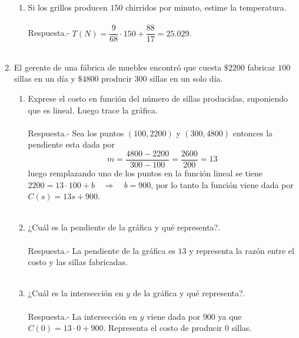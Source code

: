 \begin{enumerate}
\begin{enumerate}[\bfseries (a)]
	\item Si los grillos producen $150$ chirridos por minuto, estime la temperatura.\\\\
	    Respuesta.-\; $T(N)=\dfrac{9}{68}\cdot 150 + \dfrac{88}{17} = 25.029$.\\\\
    \end{enumerate}

    \item El gerente de una fábrica de muebles encontró que cuesta $\$ 2200$ fabricar $100$ sillas en un día y $ \$ 4800$ producir $300$ sillas en un solo día.

    \begin{enumerate}[\bfseries (a)]

	\item Exprese el costo en función del número de sillas producidas, suponiendo que es lineal. Luego trace la gráfica.\\\\
	    Respuesta.-\; Sea los puntos $(100,2200)$ y $(300,4800)$ entonces la pendiente esta dada por $$m=\dfrac{4800-2200}{300-100}=\dfrac{2600}{200}=13$$ luego remplazando uno de los puntos en la función lineal se tiene $2200=13\cdot 100 + b \quad \Rightarrow \quad b=900$, por lo tanto la función viene dada por $C(s)=13s + 900$.\\\\

	\item ¿Cuál es la pendiente de la gráfica y qué representa?.\\\\
	    Respuesta.-\; La pendiente de la gráfica es $13$ y representa la razón entre el costo y las sillas fabricadas.\\\\

	\item ¿Cuál es la intersección en $y$ de la gráfica y qué representa?.\\\\
	    Respuesta.-\; La intersección en $y$ viene dada por $900$ ya que $C(0)=13\cdot 0 + 900$. Representa el costo de producir $0$ sillas.\\\\

    \end{enumerate}


\end{enumerate}
